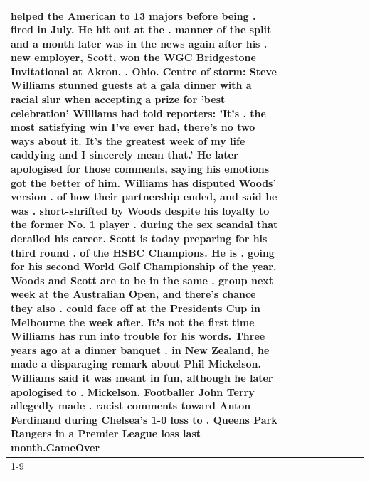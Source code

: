 \begin{table}[H]
\begin{tabular}{lllrlllll}
helped the American to 13 majors before being . fired in July. He hit out at the . manner of the split and a month later was in the news again after his . new employer, Scott, won the WGC Bridgestone Invitational at Akron, . Ohio. Centre of storm: Steve Williams stunned guests at a gala dinner with a racial slur when accepting a prize for 'best celebration' Williams had told reporters: 'It's . the most satisfying win I've ever had, there's no two ways about it. It's the greatest week of my life caddying and I sincerely mean that.' He later apologised for those comments, saying his emotions got the better of him. Williams has disputed Woods' version . of how their partnership ended, and said he was . short-shrifted by Woods despite his loyalty to the former No. 1 player . during the sex scandal that derailed his career. Scott is today preparing for his third round . of the HSBC Champions. He is . going for his second World Golf Championship of the year. Woods and Scott are to be in the same . group next week at the Australian Open, and there's chance they also . could face off at the Presidents Cup in Melbourne the week after. It's not the first time Williams has run into trouble for his words. Three years ago at a dinner banquet . in New Zealand, he made a disparaging remark about Phil Mickelson. Williams said it was meant in fun, although he later apologised to . Mickelson. Footballer John Terry allegedly made . racist comments toward Anton Ferdinand during Chelsea's 1-0 loss to . Queens Park Rangers in a Premier League loss last month.GameOver \\
\cline{1-9}

\end{tabular}
\end{table}
